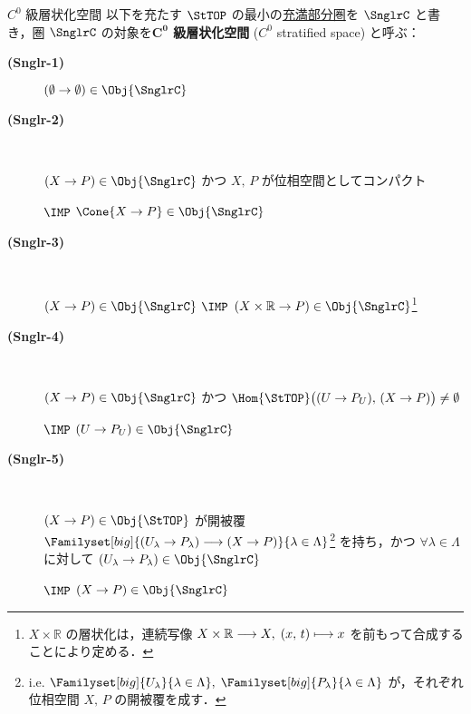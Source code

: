 \documentclass[TQFT_main]{subfiles}
\begin{document}
\begin{mydef}[label=def:Snglr-C0]{$C^0$ 級層状化空間}
    以下を充たす $\StTOP$ の最小の\hyperref[def:faithful]{充満部分圏}を $\SnglrC$ と書き，圏 $\SnglrC$ の対象を\textbf{$\bm{C^0}$ 級層状化空間} ($C^0$ stratified space) と呼ぶ：
    \begin{description}
        \item[\textbf{(Snglr-1)}] $(\emptyset \to \emptyset) \in \Obj{\SnglrC}$
        \item[\textbf{(Snglr-2)}]　
        
        $(X \to P) \in \Obj{\SnglrC}$ かつ $X,\, P$ が位相空間としてコンパクト 
        
        $\IMP$ $\Cone{X \to P} \in \Obj{\SnglrC}$
        
        \item[\textbf{(Snglr-3)}]　
        
        $(X \to P) \in \Obj{\SnglrC}$ $\IMP$ $(X \times \mathbb{R} \to P) \in \Obj{\SnglrC}$\footnote{$X \times \mathbb{R}$ の層状化は，連続写像 $X \times \mathbb{R} \longrightarrow X,\; (x,\, t) \longmapsto x$ を前もって合成することにより定める．}
        
        \item[\textbf{(Snglr-4)}]　
        
        $(X \to P) \in \Obj{\SnglrC}$ かつ $\Hom{\StTOP} \bigl( (U \to P_U),\, (X \to P) \bigr) \neq \emptyset$ 
        
        $\IMP$ $(U \to P_U) \in \Obj{\SnglrC}$
        
        \item[\textbf{(Snglr-5)}]　 
        
        $(X \to P) \in \Obj{\StTOP}$ が開被覆 $\Familyset[big]{(U_\lambda \to P_\lambda) \lto (X \to P)}{\lambda \in \Lambda}$\footnote{i.e. $\Familyset[big]{U_\lambda}{\lambda \in \Lambda},\; \Familyset[big]{P_\lambda}{\lambda \in \Lambda}$ が，それぞれ位相空間 $X,\, P$ の開被覆を成す．} を持ち，かつ $\forall \lambda \in \Lambda$ に対して $(U_\lambda \to P_\lambda) \in \Obj{\SnglrC}$ 
        
        $\IMP$ $(X \to P) \in \Obj{\SnglrC}$
    \end{description}
\end{mydef}
\end{document}
